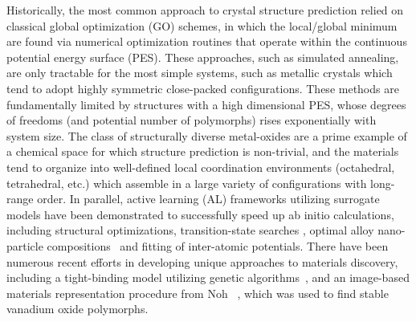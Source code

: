 %
%
Historically, the most common approach to crystal structure prediction relied on classical global optimization (GO) schemes,
in which the local/global minimum are found via numerical optimization routines that operate within the continuous potential energy surface (PES).  %
%
These approaches, such as simulated annealing, are only tractable for the most simple systems,
such as metallic crystals which tend to adopt highly symmetric close-packed configurations.
%
These methods are fundamentally limited by structures with a high dimensional PES, whose degrees of freedoms (and potential number of polymorphs) rises exponentially with system size.\cite{Stillinger1999} The class of structurally diverse metal-oxides are a prime example of a chemical space for which structure prediction is non-trivial, and the materials tend to organize into well-defined local coordination environments (octahedral, tetrahedral, etc.) which assemble in a large variety of configurations with long-range order.
%
In parallel, active learning (AL) frameworks utilizing surrogate models have been demonstrated to successfully speed up ab initio calculations, including structural optimizations\cite{hansen2019atomistic}, transition-state searches \cite{torres2019low}, optimal alloy nano-particle compositions~\cite{Jennings2019} and fitting of inter-atomic potentials.\cite{podryabinkin2017active}
%
There have been numerous recent efforts in developing unique approaches to materials discovery, including a tight-binding model utilizing genetic algorithms~\cite{VanDenBossche2018}, and an image-based materials representation procedure from Noh ~\cite{noh2019inverse}, which was used to find stable vanadium oxide polymorphs.
